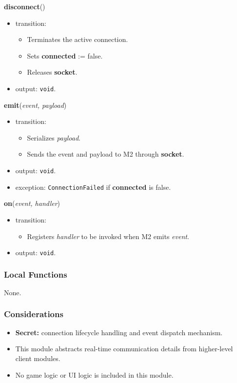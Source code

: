 \documentclass[12pt, titlepage]{article}
\begin{document}
\noindent\textbf{disconnect}()
\begin{itemize}
    \item transition:
    \begin{itemize}
        \item Terminates the active connection.
        \item Sets \textbf{connected} := false.
        \item Releases \textbf{socket}.
    \end{itemize}
    \item output: \texttt{void}.
\end{itemize}

\noindent\textbf{emit}(\textit{event, payload})
\begin{itemize}
    \item transition:
    \begin{itemize}
        \item Serializes \textit{payload}.
        \item Sends the event and payload to M2 through \textbf{socket}.
    \end{itemize}
    \item output: \texttt{void}.
    \item exception: \texttt{ConnectionFailed} if \textbf{connected} is false.
\end{itemize}

\noindent\textbf{on}(\textit{event, handler})
\begin{itemize}
    \item transition:
    \begin{itemize}
        \item Registers \textit{handler} to be invoked when M2 emits \textit{event}.
    \end{itemize}
    \item output: \texttt{void}.
\end{itemize}

\subsubsection{Local Functions}
None.

\subsubsection{Considerations}
\begin{itemize}
    \item \textbf{Secret:} connection lifecycle handling and event dispatch mechanism.
    \item This module abstracts real-time communication details from higher-level client modules.
    \item No game logic or UI logic is included in this module.
\end{itemize}
\end{document}
